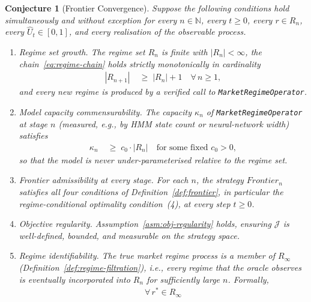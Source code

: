 \documentclass[12pt,openany]{book}
\numberwithin{equation}{chapter}
\theoremstyle{plain}
\newtheorem{conjecture}[theorem]{Conjecture}
\theoremstyle{definition}
\theoremstyle{remark}
\numberwithin{equation}{chapter}
\theoremstyle{plain}
\newcommand{\Frontier}{F}
\newcommand{\calR}{\mathcal{R}}
\def\Frontier{Frontier}%
\def\calR{R}%
\begin{document}
\begin{conjecture}[Frontier Convergence]
\label{conj:frontier}
Suppose the following conditions hold simultaneously and
without exception for every $n \in \mathbb{N}$,
every $t \geq 0$, every $r \in \calR_n$,
every $\hat{U}_t \in [0,1]$, and every realisation of the
observable process.
\begin{enumerate}
  \item \emph{Regime set growth.}
        The regime set $\calR_n$ is finite with
        $|\calR_n| < \infty$, the chain~\eqref{eq:regime-chain}
        holds strictly monotonically in cardinality
        \begin{align}
          |\calR_{n+1}|
          &\;\geq\;
          |\calR_n| + 1
          \quad \forall\, n \geq 1,
          \label{eq:regime-grow}
        \end{align}
        and every new regime is produced by a verified call to
        \texttt{MarketRegimeOperator}.
  \item \emph{Model capacity commensurability.}
        The capacity $\kappa_n$ of
        \texttt{MarketRegimeOperator} at stage $n$
        (measured, e.g., by HMM state count or neural-network
        width) satisfies
        \begin{align}
          \kappa_n
          &\;\geq\;
          c_0 \cdot |\calR_n|
          \quad \text{for some fixed } c_0 > 0,
          \label{eq:capacity}
        \end{align}
        so that the model is never under-parameterised
        relative to the regime set.
  \item \emph{Frontier admissibility at every stage.}
        For each $n$, the strategy $\Frontier_n$ satisfies
        all four conditions of Definition~\ref{def:frontier},
        in particular the regime-conditional optimality
        condition~(4), at every step $t \geq 0$.
  \item \emph{Objective regularity.}
        Assumption~\ref{asm:obj-regularity} holds, ensuring
        $\mathcal{J}$ is well-defined, bounded, and
        measurable on the strategy space.
  \item \emph{Regime identifiability.}
        The true market regime process is a member of
        $\calR_\infty$ (Definition~\ref{def:regime-filtration}),
        i.e., every regime that the oracle observes is
        eventually incorporated into $\calR_n$ for
        sufficiently large $n$.
        Formally,
        \begin{align}
          \forall\, r^* \in \calR_{\infty}

\end{align}
\end{enumerate}
\end{conjecture}
\end{document}
